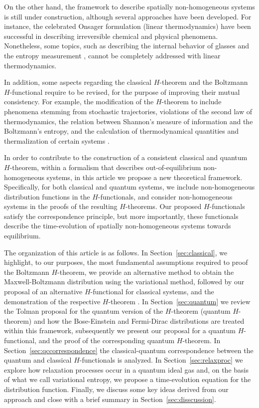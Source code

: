 On the other hand, the framework to describe spatially non-homogeneous systems is still
under construction, although several approaches have been developed. For instance,
the celebrated Onsager formulation (linear thermodynamics)
\cite{bib:keizer1987,bib:onsager1931} have been successful in describing irreversible chemical 
and physical phenomena. Nonetheless, some topics, such as describing the internal behavior of glasses
\cite{bib:zanotto2018} and the entropy measurement
\cite{bib:schmelzer2018,bib:nemilov2018}, cannot be completely addressed with linear thermodynamics.

In addition, some aspects regarding the classical $H$-theorem and the
Boltzmann $H$-functional require to be revised, for the purpose of improving their mutual consistency.
For example, the modification of the $H$-theorem to include phenomena stemming from stochastic
trajectories, violations of the second law of thermodynamics, the relation
between Shannon's measure of information and the Boltzmann's entropy, 
and the calculation of thermodynamical quantities and thermalization of certain systems
\cite{bib:gorban2014,bib:li2019,bib:gring2012,bib:nemilov2018,bib:wang2014}.

In order to contribute to the construction of a consistent classical and
quantum $H$-theorem, within a formalism that describes out-of-equilibrium
non-homogeneous systems, in this article we propose a new theoretical framework.
Specifically, for both classical and quantum systems, we include non-homogeneous distribution functions in
the $H$-functionals, and consider non-homogeneous systems in the proofs of the resulting
$H$-theorems. Our proposed $H$-functionals satisfy
the correspondence principle, but more importantly, these functionals describe
the time-evolution of spatially non-homogeneous
systems towards equilibrium.

The organization of this article is as follows.
In Section~\ref{sec:classical}, we highlight, to our purposes, the most
fundamental assumptions required to proof the Boltzmann $H$-theorem,
we provide an alternative method to obtain the Maxwell-Boltzmann
distribution using the variational method, followed by our proposal of
an alternative $H$-functional for classical systems, and the demonstration of
the respective $H$-theorem . In Section~\ref{sec:quantum}
we review the Tolman proposal for the quantum
version of the $H$-theorem (quantum $H$-theorem)
and how the Bose-Einstein and Fermi-Dirac distributions are treated within
this framework, subsequently we present our proposal for a quantum $H$-functional,
and the proof of the corresponding quantum $H$-theorem. In 
Section~\ref{sec:qccorrespondence}
the classical-quantum correspondence between the
quantum and classical $H$-functionals is analyzed.
In Section~\ref{sec:relaxproc} we explore how relaxation processes occur
in a quantum ideal gas and, on the basis of what we call variational entropy,
we propose a time-evolution equation for the distribution function. Finally,
we discuss some key ideas derived from our approach and close with a brief summary
in Section~\ref{sec:disscussion}.


